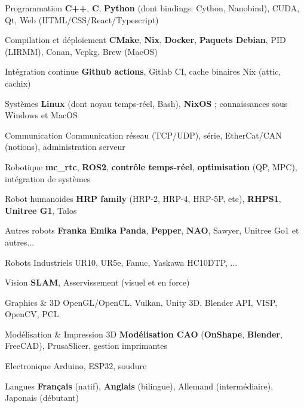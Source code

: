 
\begin{cvskills}

  \cvskill
  {Programmation} %
  {\textbf{C++}, \textbf{C}, \textbf{Python} (dont bindings: Cython, Nanobind), CUDA, Qt, Web
  (HTML/CSS/React/Typescript)} %

  \cvskill
  {Compilation et déploiement} %
  {\textbf{CMake}, \textbf{Nix}, \textbf{Docker}, \textbf{Paquets Debian}, PID (LIRMM), Conan, Vcpkg, Brew (MacOS)}

  \cvskill
  {Intégration continue} %
  {\textbf{Github actions}, Gitlab CI, cache binaires Nix (attic, cachix)} %

  \cvskill
  {Systèmes}
  {\textbf{Linux} (dont noyau temps-réel, Bash), \textbf{NixOS} ; connaissances sous Windows et MacOS}

  \cvskill
  {Communication}
  {Communication réseau (TCP/UDP), série, EtherCat/CAN (notions), administration serveur}

  \cvskill
  {Robotique} %
  {\textbf{mc\_rtc}, \textbf{ROS2}, \textbf{contrôle temps-réel}, \textbf{optimisation} (QP, MPC),
  intégration de systèmes}

  \cvskill
  {Robot humanoides} %
  {\textbf{HRP family} (HRP-2, HRP-4, HRP-5P, etc), \textbf{RHPS1}, \textbf{Unitree G1}, Talos}

  \cvskill
  {Autres robots}
  {\textbf{Franka Emika Panda}, \textbf{Pepper}, \textbf{NAO}, Sawyer, Unitree Go1 et autres...} %

  \cvskill
  {Robots Industriels}
  {UR10, UR5e, Fanuc, Yaskawa HC10DTP, ...} %

  \cvskill
  {Vision} %
  {\textbf{SLAM}, Asservissement (visuel et en force)} %

  \cvskill
  {Graphics \& 3D}
  {OpenGL/OpenCL, Vulkan, Unity 3D, Blender API, VISP, OpenCV, PCL} %

  \cvskill
  {Modélisation \& Impression 3D} %
  {\textbf{Modélisation CAO} (\textbf{OnShape}, \textbf{Blender}, FreeCAD), PrusaSlicer, gestion imprimantes} %

  \cvskill
  {Electronique}
  {Arduino, ESP32, soudure}

  \cvskill
  {Langues} %
  {\textbf{Français} (natif), \textbf{Anglais} (bilingue), Allemand (intermédiaire), Japonais (débutant)} %

\end{cvskills}
